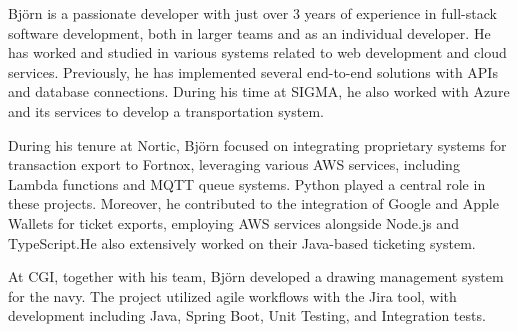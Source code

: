Björn is a passionate developer with just over 3 years of experience in full-stack software development, both in larger teams and as an individual developer. He has worked and studied in various systems related to web development and cloud services. Previously, he has implemented several end-to-end solutions with APIs and database connections. During his time at SIGMA, he also worked with Azure and its services to develop a transportation system.

\vspace{6pt}
During his tenure at Nortic, Björn focused on integrating proprietary systems for transaction export to Fortnox, leveraging various AWS services, including Lambda functions and MQTT queue systems. Python played a central role in these projects.
Moreover, he contributed to the integration of Google and Apple Wallets for ticket exports, employing AWS services alongside Node.js and TypeScript.He also extensively worked on their Java-based ticketing system.

\vspace{6pt}
At CGI, together with his team, Björn developed a drawing management system for the navy. The project utilized agile workflows with the Jira tool, with development including Java, Spring Boot, Unit Testing, and Integration tests.